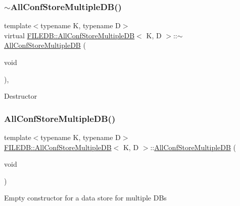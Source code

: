 \subsubsection{\texorpdfstring{$\sim$AllConfStoreMultipleDB()}{~AllConfStoreMultipleDB()}\hspace{0.1cm}{\footnotesize\ttfamily [1/3]}}
{\footnotesize\ttfamily template$<$typename K, typename D$>$ \\
virtual \mbox{\hyperlink{classFILEDB_1_1AllConfStoreMultipleDB}{F\+I\+L\+E\+D\+B\+::\+All\+Conf\+Store\+Multiple\+DB}}$<$ K, D $>$\+::$\sim$\mbox{\hyperlink{classFILEDB_1_1AllConfStoreMultipleDB}{All\+Conf\+Store\+Multiple\+DB}} (\begin{DoxyParamCaption}\item[{void}]{ }\end{DoxyParamCaption})\hspace{0.3cm}{\ttfamily [inline]}, {\ttfamily [virtual]}}

Destructor \mbox{\label{classFILEDB_1_1AllConfStoreMultipleDB_a0c45fce64168ca576e875747eb599927}} 
\subsubsection{\texorpdfstring{AllConfStoreMultipleDB()}{AllConfStoreMultipleDB()}\hspace{0.1cm}{\footnotesize\ttfamily [2/3]}}
{\footnotesize\ttfamily template$<$typename K, typename D$>$ \\
\mbox{\hyperlink{classFILEDB_1_1AllConfStoreMultipleDB}{F\+I\+L\+E\+D\+B\+::\+All\+Conf\+Store\+Multiple\+DB}}$<$ K, D $>$\+::\mbox{\hyperlink{classFILEDB_1_1AllConfStoreMultipleDB}{All\+Conf\+Store\+Multiple\+DB}} (\begin{DoxyParamCaption}\item[{void}]{ }\end{DoxyParamCaption})\hspace{0.3cm}{\ttfamily [inline]}}

Empty constructor for a data store for multiple D\+Bs \mbox{\label{classFILEDB_1_1AllConfStoreMultipleDB_a88489be8d488c6fe3a88312f200e7fdd}} 
